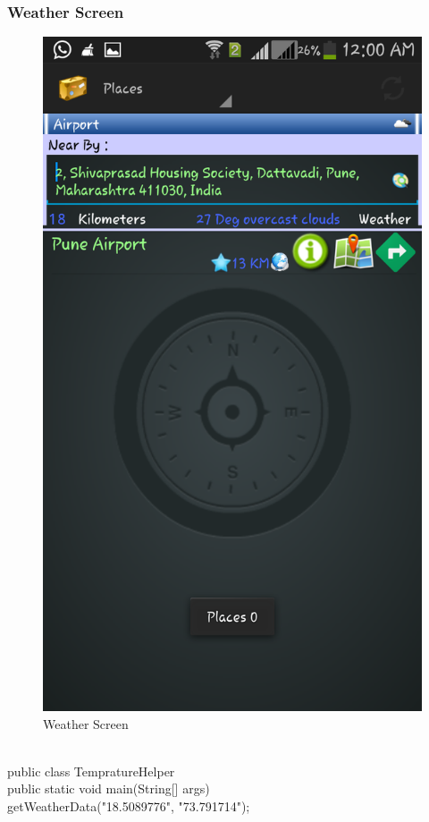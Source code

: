 \documentclass[12pt,a4paper]{article}
\begin{document}
{\subsubsection{Weather Screen}
\begin{figure}[!htb]
\centering
\includegraphics[width=12 cm]{weather}
\caption{Weather Screen}
\end{figure}
\\
\hspace{0.7 cm}public class TempratureHelper {\\
	public static void main(String[] args) {\\
		getWeatherData("18.5089776", "73.791714");\\
	}\\

}}
\end{document}

